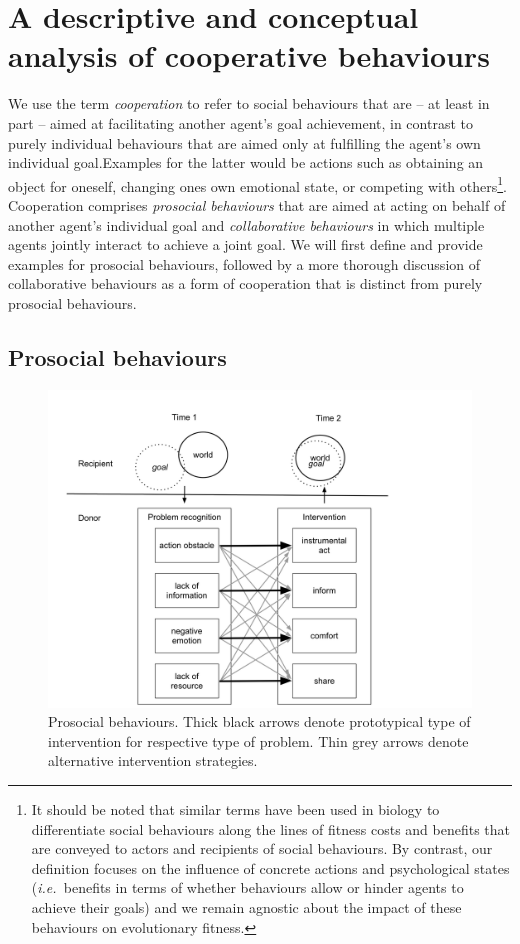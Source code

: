 \documentclass{article}
\newcommand{\ie}{{\textit{i.e.~}}}
\begin{document}
\section{A descriptive and conceptual analysis of cooperative behaviours}

We use the term \emph{cooperation} to refer to social behaviours that are -- at
least in part -- aimed at facilitating another agent's goal achievement, in
contrast to purely individual behaviours that are aimed only at fulfilling the
agent's own individual goal.Examples for the latter would be actions such as
obtaining an object for oneself, changing ones own emotional state, or
competing with others\footnote{It should be noted that similar terms have been
used in biology to differentiate social behaviours along the lines of fitness costs
and benefits that are conveyed to actors and recipients of social behaviours. By
contrast, our definition focuses on the influence of concrete actions and
psychological states (\ie benefits in terms of whether behaviours allow or
hinder agents to achieve their goals) and we remain agnostic about the impact
of these behaviours on evolutionary fitness.}. Cooperation comprises
\emph{prosocial behaviours} that are aimed at acting on behalf of another
agent's individual goal and \emph{collaborative behaviours} in which
multiple agents jointly interact to achieve a joint goal. We will first define
and provide examples for prosocial behaviours, followed by a more thorough
discussion of collaborative behaviours as a form of cooperation that is distinct
from purely prosocial behaviours.

\subsection{Prosocial behaviours}

\begin{figure}
\center
\includegraphics[width=0.9\columnwidth]{figs/prosocial_behaviours.png}
\caption{Prosocial behaviours. Thick black arrows denote prototypical type of
intervention for respective type of problem. Thin grey arrows denote
alternative intervention strategies.}
\label{fig-prosocial}
\end{figure}
\end{document}
